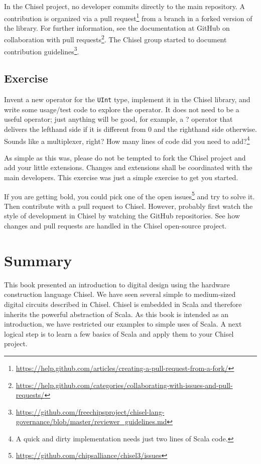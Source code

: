 \documentclass[%
    10pt,
    headinclude, footexclude,
    openright, %
    notitlepage,
    cleardoubleempty,
    headsepline,
    pointlessnumbers,
    bibtotoc, idxtotoc,
    ]{scrbook}
\newcommand{\code}[1]{{\lstinline[basicstyle=\small\ttfamily]{#1}}}
\newcommand{\myref}[2]{\href{#1}{#2}}
\renewcommand{\myref}[2]{{#2}{\footnote{\url{#1}}}}
\begin{document}
In the Chisel project, no developer commits directly to the main repository.
A contribution is organized via a
\myref{https://help.github.com/articles/creating-a-pull-request-from-a-fork/}{pull request}
from a branch in a forked version of the library.
For further information, see the documentation at GitHub on
\myref{https://help.github.com/categories/collaborating-with-issues-and-pull-requests/}{collaboration with
pull requests}.
The Chisel group started to document
\myref{https://github.com/freechipsproject/chisel-lang-governance/blob/master/reviewer_guidelines.md}{contribution
guidelines}.

\section{Exercise}

Invent a new operator for the \code{UInt} type, implement it in the Chisel library,
and write some usage/test code to explore the operator. It does not need to be
a useful operator; just anything will be good, for example, a ? operator that delivers the lefthand side
if it is different from 0 and the righthand side otherwise. Sounds like a multiplexer, right?
How many lines of code did you need to add?\footnote{A quick and dirty implementation
needs just two lines of Scala code.}

As simple as this was, please do not be tempted to fork the Chisel project and
add your little extensions. Changes and extensions shall be coordinated with the
main developers.
This exercise was just a simple exercise to get you started.

If you are getting bold, you could pick one of the
\myref{https://github.com/chipsalliance/chisel3/issues}{open issues} and try to solve it.
Then contribute with a pull request to Chisel.
However, probably first watch the style of development in Chisel by watching the GitHub
repositories.
See how changes and pull requests are handled in the Chisel open-source project.


\chapter{Summary}
\label{sec:conclusion}

This book presented an introduction to digital design using the
hardware construction language Chisel.
We have seen several simple to medium-sized digital circuits
described in Chisel.
Chisel is embedded in Scala and therefore inherits the powerful
abstraction of Scala.
As this book is intended as an introduction, we have restricted
our examples to simple uses of Scala.
A next logical step is to learn a few basics of Scala and apply them
to your Chisel project.
\end{document}
